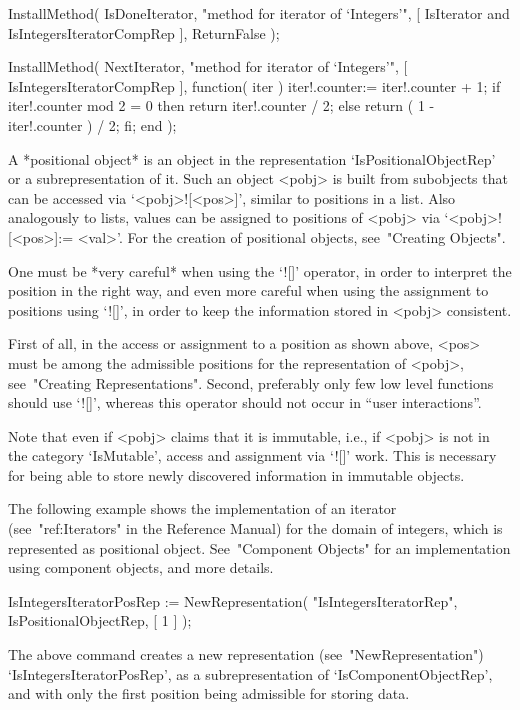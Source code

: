 \begintt
InstallMethod( IsDoneIterator,
    "method for iterator of `Integers'",
    [ IsIterator and IsIntegersIteratorCompRep ],
    ReturnFalse );

InstallMethod( NextIterator,
    "method for iterator of `Integers'",
    [ IsIntegersIteratorCompRep ],
    function( iter )
    iter!.counter:= iter!.counter + 1;
    if iter!.counter mod 2 = 0 then
      return iter!.counter / 2;
    else
      return ( 1 - iter!.counter ) / 2;
    fi;
    end );
\endtt


A *positional object* is an object in the representation
`IsPositionalObjectRep' or a subrepresentation of it.
Such an object <pobj> is built from subobjects that can be accessed via
`<pobj>![<pos>]', similar to positions in a list.
Also analogously to lists, values can be assigned to positions of
<pobj> via `<pobj>![<pos>]:= <val>'.
For the creation of positional objects, see~"Creating Objects".

One must be *very careful* when using the `![]' operator,
in order to interpret the position in the right way,
and even more careful when using the assignment to positions using `![]',
in order to keep the information stored in <pobj> consistent.

First of all, in the access or assignment to a position as shown above,
<pos> must be among the admissible positions
for the representation of <pobj>, see~"Creating Representations".
Second, preferably only few low level functions should use `![]',
whereas this operator should not occur in ``user interactions''.

Note that even if <pobj> claims that it is immutable, i.e., if <pobj>
is not in the category `IsMutable', access and assignment via `![]' work.
This is necessary for being able to store newly discovered information
in immutable objects.

The following example shows the implementation of an iterator
(see~"ref:Iterators" in the Reference Manual) for the domain of integers,
which is represented as positional object.
See~"Component Objects" for an implementation using component objects,
and more details.

\begintt
IsIntegersIteratorPosRep := NewRepresentation( "IsIntegersIteratorRep",
    IsPositionalObjectRep, [ 1 ] );
\endtt

The above command creates a new representation (see~"NewRepresentation")
`IsIntegersIteratorPosRep',
as a subrepresentation of `IsComponentObjectRep',
and with only the first position being admissible for storing data.

